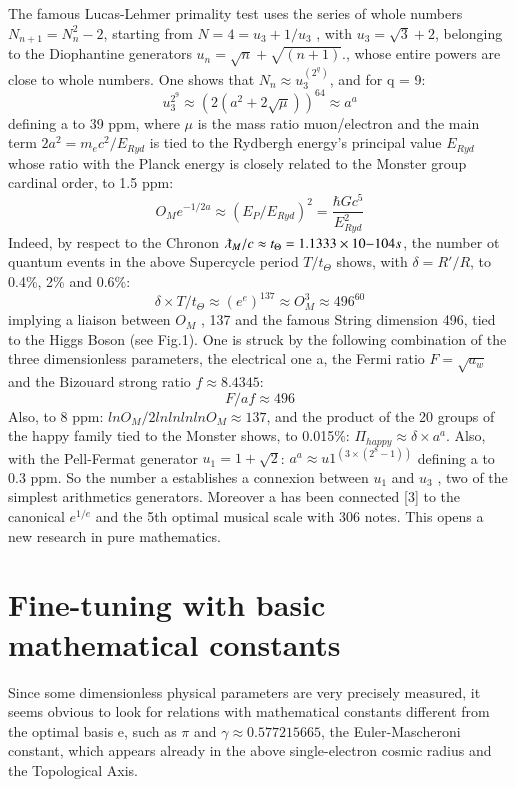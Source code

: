 \documentclass[twoside,draft]{article}
\begin{document}
\begin{sloppypar}
{The famous Lucas-Lehmer primality test uses the series of whole numbers $N_{n+1} = N_{n}^{2}-2$,
starting from $N = 4 = u_{3} + 1/u_{3}$ , with $u_{3} = \sqrt{3} + 2$, belonging to the Diophantine generators $u_{n} = \sqrt{n} + \sqrt{(n+1)}$., whose entire powers are close to whole numbers. One shows that $N_{n} \approx u_{3}^{(2^{q})}$, and for q = 9:
\begin{equation}
u_{3}^{2^9} \approx (2(a^{2} + 2\sqrt{\mu}))^{64} \approx a^{a}
\end{equation}
defining a to 39 ppm, where $\mu$ is the mass ratio muon/electron and the main term $2a^{2} = m_{e} c^{2}/E_{Ryd}$ is
tied to the Rydbergh energy's principal value $E_{Ryd}$ whose ratio with the Planck energy is closely
related to the Monster group cardinal order, to 1.5 ppm:
\begin{equation}
O_{M} e^{-1/2a} \approx (E_{P} /E_{Ryd})^{2} = \frac{\hbar Gc^{5}}{E_{Ryd}^{2}}
\end{equation}
Indeed, by respect to the Chronon $\lambdabar_M /c \approx t_{\Theta} = 1.1333 \times 10{-104} s$, the number ot quantum events in
the above Supercycle period $T/ t_{\Theta}$ shows, with $\delta = R\prime/R$, to 0.4\%, 2\% and 0.6\%:
$$\delta \times T/t_{\Theta} \approx (e^{e})^{137} \approx O_{M}^{3} \approx 496^{60}$$
implying a liaison between $O_{M}$ , 137 and the famous String dimension 496, tied to the Higgs Boson
(see Fig.1). One is struck by the following combination of the three dimensionless parameters, the electrical
one a, the Fermi ratio $F =\sqrt{a_{w}}$ and the Bizouard strong ratio $f \approx 8.4345$:
$$F/af \approx 496$$
Also, to 8 ppm: $lnO_{M} /2lnlnlnlnO_{M} \approx 137$, and the product of the 20 groups of the happy family tied
to the Monster shows, to 0.015\%:
$\Pi_{happy} \approx \delta \times a^{a}$. Also, with the Pell-Fermat generator $u_{1} = 1 + \sqrt{2}$:
$a^{a} \approx u 1^(3\times(2^{8}-1))$
defining a to 0.3 ppm. So the number a establishes a connexion between $u_{1}$ and $u_{3}$ , two of the
simplest arithmetics generators. Moreover a has been connected [3] to the canonical $e^{1/e}$ and the
5th optimal musical scale with 306 notes. This opens a new research in pure mathematics.

\section{Fine-tuning with basic mathematical constants}
Since some dimensionless physical parameters are very precisely measured, it seems obvious to look for
relations with mathematical constants different from the optimal basis e, such as $\pi$ and $\gamma \approx
0.577215665$, the Euler-Mascheroni constant, which appears already in the above single-electron
cosmic radius and the Topological Axis.

}
\end{sloppypar}
\end{document}
